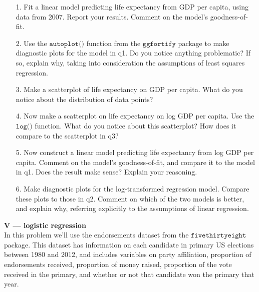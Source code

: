 \documentclass[10pt]{extarticle}
\begin{document}
\begin{itemize}
		
	\item[1.] Fit a linear model predicting life expectancy from GDP per capita, using data from 2007. Report your results. Comment on the model's goodness-of-fit. \\ 
	
	\item[2.] Use the $\texttt{autoplot()}$ function from the $\texttt{ggfortify}$ package to make diagnostic plots for the model in q1. Do you notice anything problematic? If so, explain why, taking into consideration the assumptions of least squares regression. \\ 
	
	\item[3.] Make a scatterplot of life expectancy on GDP per capita. What do you notice about the distribution of data points? \\ 
	
    \item[4.] Now make a scatterplot on life expectancy on log GDP per capita. Use the $\texttt{log()}$ function. What do you notice about this scatterplot? How does it compare to the scatterplot in q3? \\ 
    
    \item[5.] Now construct a linear model predicting life expectancy from log GDP per capita. Comment on the model's goodness-of-fit, and compare it to the model in q1. Does the result make sense? Explain your reasoning. \\ 
    
    \item[6.] Make diagnostic plots for the log-transformed regression model. Compare these plots to those in q2. Comment on which of the two models is better, and explain why, referring explicitly to the assumptions of linear regression.

\end{itemize}


\hfill 

{\Large \bf V --- logistic regression}  \\

In this problem we'll use the endorsements dataset from the $\texttt{fivethirtyeight}$ package. This dataset has information on each candidate in primary US elections between 1980 and 2012, and includes variables on party affiliation, proportion of endorsements received, proportion of money raised, proportion of the vote received in the primary, and whether or not that candidate won the primary that year. \\ 
\end{document}
